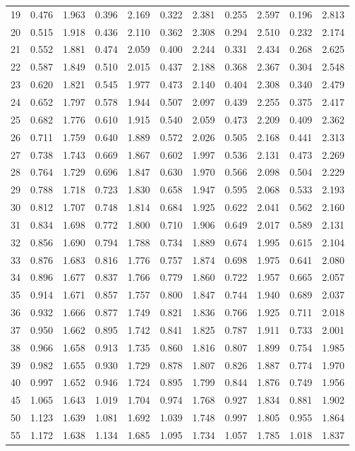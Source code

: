 \documentclass[12pt]{article}
\begin{document}
\begin{table}
\begin{center}
{\begin{tabular}{|c|c|c|c|c|c|c|c|c|c|c|}
	19&0.476&1.963&0.396&2.169&0.322&2.381&0.255&2.597&0.196&2.813\\
	20&0.515&1.918&0.436&2.110&0.362&2.308&0.294&2.510&0.232&2.174\\
	21&0.552&1.881&0.474&2.059&0.400&2.244&0.331&2.434&0.268&2.625\\
	22&0.587&1.849&0.510&2.015&0.437&2.188&0.368&2.367&0.304&2.548\\
	23&0.620&1.821&0.545&1.977&0.473&2.140&0.404&2.308&0.340&2.479\\
	24&0.652&1.797&0.578&1.944&0.507&2.097&0.439&2.255&0.375&2.417\\
	25&0.682&1.776&0.610&1.915&0.540&2.059&0.473&2.209&0.409&2.362\\
	26&0.711&1.759&0.640&1.889&0.572&2.026&0.505&2.168&0.441&2.313\\
	27&0.738&1.743&0.669&1.867&0.602&1.997&0.536&2.131&0.473&2.269\\
	28&0.764&1.729&0.696&1.847&0.630&1.970&0.566&2.098&0.504&2.229\\
	29&0.788&1.718&0.723&1.830&0.658&1.947&0.595&2.068&0.533&2.193\\
	30&0.812&1.707&0.748&1.814&0.684&1.925&0.622&2.041&0.562&2.160\\
	31&0.834&1.698&0.772&1.800&0.710&1.906&0.649&2.017&0.589&2.131\\
	32&0.856&1.690&0.794&1.788&0.734&1.889&0.674&1.995&0.615&2.104\\
	33&0.876&1.683&0.816&1.776&0.757&1.874&0.698&1.975&0.641&2.080\\
	34&0.896&1.677&0.837&1.766&0.779&1.860&0.722&1.957&0.665&2.057\\
	35&0.914&1.671&0.857&1.757&0.800&1.847&0.744&1.940&0.689&2.037\\
	36&0.932&1.666&0.877&1.749&0.821&1.836&0.766&1.925&0.711&2.018\\
	37&0.950&1.662&0.895&1.742&0.841&1.825&0.787&1.911&0.733&2.001\\
	38&0.966&1.658&0.913&1.735&0.860&1.816&0.807&1.899&0.754&1.985\\
	39&0.982&1.655&0.930&1.729&0.878&1.807&0.826&1.887&0.774&1.970\\
	40&0.997&1.652&0.946&1.724&0.895&1.799&0.844&1.876&0.749&1.956\\
	45&1.065&1.643&1.019&1.704&0.974&1.768&0.927&1.834&0.881&1.902\\
	50&1.123&1.639&1.081&1.692&1.039&1.748&0.997&1.805&0.955&1.864\\
	55&1.172&1.638&1.134&1.685&1.095&1.734&1.057&1.785&1.018&1.837\\

\end{tabular}}
\end{center}
\end{table}
\end{document}
